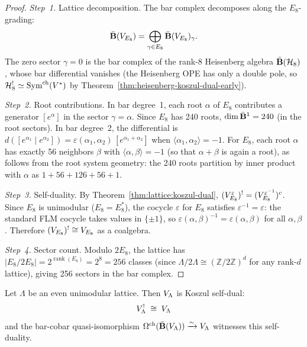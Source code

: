 \begin{proof}
\emph{Step~1.} Lattice decomposition.
The bar complex decomposes along the $E_8$-grading:
\[
\bar{\mathbf{B}}(V_{E_8}) = \bigoplus_{\gamma \in E_8} \bar{\mathbf{B}}(V_{E_8})_\gamma.
\]
The zero sector $\gamma = 0$ is the bar complex of the rank-8 Heisenberg algebra
$\bar{\mathbf{B}}(\mathcal{H}_8)$, whose bar differential vanishes (the Heisenberg OPE has only
a double pole, so $\mathcal{H}_8^! \simeq \mathrm{Sym}^{\mathrm{ch}}(V^*)$
by Theorem~\ref{thm:heisenberg-koszul-dual-early}).

\emph{Step~2.} Root contributions.
In bar degree~1, each root $\alpha$ of $E_8$ contributes a generator $[e^\alpha]$ in the sector $\gamma = \alpha$.  Since $E_8$ has 240 roots, $\dim \bar{\mathbf{B}}^1 = 240$ (in the root sectors).  In bar degree~2, the differential is $d([e^{\alpha_1} \mid e^{\alpha_2}]) = \varepsilon(\alpha_1,\alpha_2)\,[e^{\alpha_1+\alpha_2}]$ when $\langle\alpha_1,\alpha_2\rangle = -1$.  For $E_8$, each root $\alpha$ has exactly 56 neighbors $\beta$ with $\langle\alpha,\beta\rangle = -1$ (so that $\alpha+\beta$ is again a root), as follows from the root system geometry: the 240 roots partition by inner product with $\alpha$ as $1 + 56 + 126 + 56 + 1$.

\emph{Step~3.} Self-duality.
By Theorem~\ref{thm:lattice:koszul-dual}, $(V_{E_8}^\varepsilon)^! = (V_{E_8}^{\varepsilon^{-1}})^c$.  Since $E_8$ is unimodular ($E_8 = E_8^*$), the cocycle $\varepsilon$ for $E_8$ satisfies $\varepsilon^{-1} = \varepsilon$: the standard FLM cocycle takes values in $\{\pm 1\}$, so $\varepsilon(\alpha,\beta)^{-1} = \varepsilon(\alpha,\beta)$ for all $\alpha,\beta$.  Therefore $(V_{E_8})^! \cong V_{E_8}$ as a coalgebra.

\emph{Step~4.} Sector count.
Modulo $2E_8$, the lattice has $|E_8/2E_8| = 2^{\operatorname{rank}(E_8)} = 2^8 = 256$ classes (since $\Lambda/2\Lambda \cong (\mathbb{Z}/2\mathbb{Z})^d$ for any rank-$d$ lattice), giving 256 sectors in the bar complex.
\end{proof}

\begin{theorem}\label{thm:lattice:unimodular-self-dual}
Let $\Lambda$ be an even unimodular lattice.  Then $V_\Lambda$ is Koszul self-dual:
\[
V_\Lambda^! \;\cong\; V_\Lambda
\]
and the bar-cobar quasi-isomorphism $\Omega^{\mathrm{ch}}(\bar{\mathbf{B}}(V_\Lambda)) \xrightarrow{\sim} V_\Lambda$ witnesses this self-duality.
\end{theorem}

